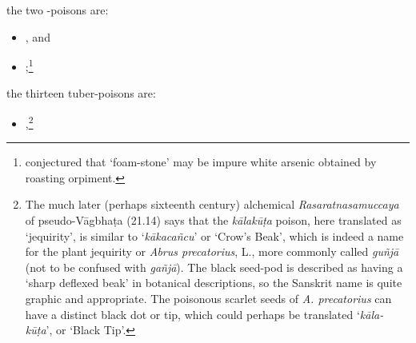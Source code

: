\begin{translation}
        \item
        the two -poisons are:
              \begin{itemize}
            
        \item {}, and
        \item {};\footnote{\citet[38--42]{dutt-1922} conjectured that
        `foam-stone' may be impure white arsenic obtained by roasting orpiment.}
            \end{itemize}
        \item
        the thirteen tuber-poisons are:
        \begin{itemize}
             \item {},\footnote{The much later (perhaps sixteenth century) alchemical
        \emph{Rasa\-ratna\-samuccaya} of pseudo-Vāgbhaṭa (21.14) says that the
        \emph{kāla\-kūṭa} poison, here translated as `jequirity', is similar to
        `\emph{kāka\-cañcu}' or `Crow's Beak', which is indeed a name for the
        plant jequirity or
        \emph{Abrus precatorius}, L., more commonly called \emph{guñjā} (not to
        be confused with \emph{gañjā}). The black seed-pod is described as
        having a `sharp deflexed beak' in botanical descriptions, so the
        Sanskrit name is quite graphic and appropriate. The poisonous scarlet
        seeds of \emph{A. precatorius} can have a distinct black dot or tip,
        which could perhaps be translated `\emph{kāla-kūṭa}', or `Black Tip'.
        
}
\end{itemize}
\end{translation}
